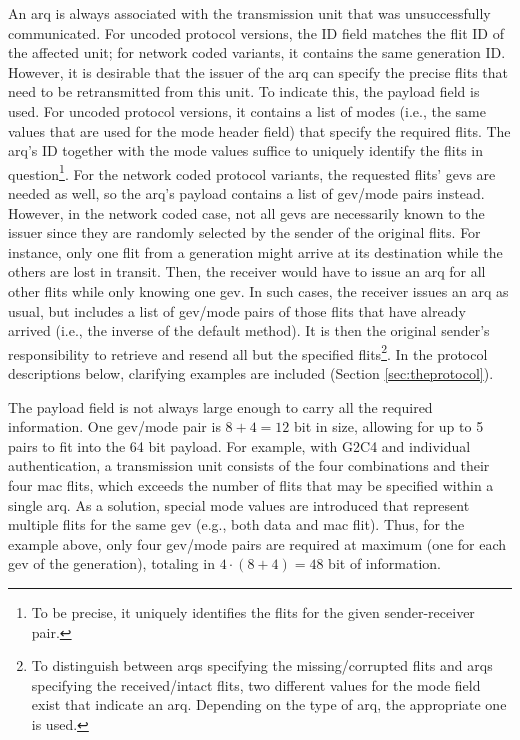 An \gls{arq} is always associated with the transmission unit that was unsuccessfully communicated. For uncoded protocol versions, the ID field
matches the flit ID of the affected unit; for network coded variants, it contains the same generation ID. However, it is desirable that the issuer of the
\gls{arq} can specify the precise flits that need to be retransmitted from this unit. To indicate this, the payload field is used. For uncoded
protocol versions, it contains a list of modes (i.e., the same values that are used for the mode header field) that specify the required flits. The
\gls{arq}'s ID together with the mode values suffice to uniquely identify the flits in question\footnote{To be precise, it uniquely identifies the flits
for the given sender-receiver pair.}. For the network coded protocol variants, the requested flits' \glspl{gev} are needed as well, so the \gls{arq}'s
payload contains a list of \gls{gev}/mode pairs instead. However, in the network coded case, not all \glspl{gev} are necessarily known to the issuer
since they are randomly selected by the sender of the original flits. For instance, only one flit from a generation might arrive at its destination
while the others are lost in transit. Then, the receiver would have to issue an \gls{arq} for all other flits while only knowing one \gls{gev}. In
such cases, the receiver issues an \gls{arq} as usual, but includes a list of \gls{gev}/mode pairs of those flits that have already arrived (i.e.,
the inverse of the default method). It is then the original sender's responsibility to retrieve and resend all but the specified flits\footnote{To
distinguish between \glspl{arq} specifying the missing/corrupted flits and \glspl{arq} specifying the received/intact flits, two different values for
the mode field exist that indicate an \gls{arq}. Depending on the type of \gls{arq}, the appropriate one is used.}. In the protocol descriptions
below, clarifying examples are included (Section \ref{sec:theprotocol}).

The payload field is not always large enough to carry all the required information. One \gls{gev}/mode pair is $8+4=12$ bit in size, allowing for up to
5 pairs to fit into the 64 bit payload. For example, with G2C4 and individual authentication, a transmission unit consists of the four combinations
and their four \gls{mac} flits, which exceeds the number of flits that may be specified within a single \gls{arq}. As a solution, special mode values
are introduced that represent multiple flits for the same \gls{gev} (e.g., both data and \gls{mac} flit). Thus, for the example above, only four
\gls{gev}/mode pairs are required at maximum (one for each \gls{gev} of the generation), totaling in $4\cdot(8+4)=48$ bit of information.

